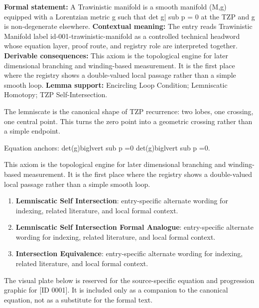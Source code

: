 \begingroup\footnotesize\setlength{\emergencystretch}{3em}\sloppy
\textbf{Formal statement:} A Trawinistic manifold is a smooth manifold (M,g) equipped with a Lorentzian metric g such that det g| sub p = 0 at the TZP and g is non-degenerate elsewhere. \textbf{Contextual meaning:} The entry reads Trawinistic Manifold label id-001-trawinistic-manifold as a controlled technical headword whose equation layer, proof route, and registry role are interpreted together. \textbf{Derivable consequences:} This axiom is the topological engine for later dimensional branching and winding-based measurement. It is the first place where the registry shows a double-valued local passage rather than a simple smooth loop. \textbf{Lemma support:} Encircling Loop Condition; Lemniscatic Homotopy; TZP Self-Intersection.\par
\endgroup

The lemniscate is the canonical shape of TZP recurrence: two lobes, one crossing, one central point. This turns the zero point into a geometric crossing rather than a simple endpoint.

Equation anchors: det(g)biglvert sub p =0 det(g)biglvert sub p =0.

This axiom is the topological engine for later dimensional branching and winding-based measurement. It is the first place where the registry shows a double-valued local passage rather than a simple smooth loop.
\endgroup

\begingroup\footnotesize\sloppy
\begin{enumerate}[leftmargin=1.35em,itemsep=1pt,topsep=1pt,parsep=0pt]
\item \textbf{Lemniscatic Self Intersection}: entry-specific alternate wording for indexing, related literature, and local formal context.
\item \textbf{Lemniscatic Self Intersection Formal Analogue}: entry-specific alternate wording for indexing, related literature, and local formal context.
\item \textbf{Intersection Equivalence}: entry-specific alternate wording for indexing, related literature, and local formal context.
\end{enumerate}
\endgroup

\begingroup\footnotesize\sloppy
The visual plate below is reserved for the source-specific equation and progression graphic for [ID 0001]. It is included only as a companion to the canonical equation, not as a substitute for the formal text.
\par\endgroup
\ifTZPDarkEdition
{}
\fi

